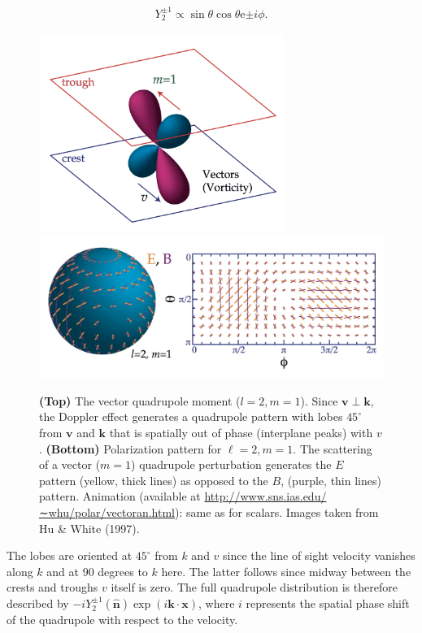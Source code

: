 \documentclass[a4paper,11pt]{article}
\begin{document}
\begin{align*}
    Y_2^{\pm1}\propto\sin\theta\cos\theta\mathrm{e}{\pm i\phi}.
\end{align*}

\begin{figure}[t!]
    \centering
    \includegraphics[width=8cm]{figures/VectorQuadrupole.png}
    \includegraphics[width=15cm]{figures/VectorPattern.png}
    \caption{\footnotesize{\textbf{(Top)} The vector quadrupole moment ($l=2,m=1$). Since $\bm{v}\perp\bm{k}$, the Doppler effect generates a quadrupole pattern with lobes $45^\circ$ from $\bm{v}$ and $\bm{k}$ that is spatially out of phase (interplane peaks) with $v$. \textbf{(Bottom)} Polarization pattern for $\ell=2,m=1$. The scattering of a vector ($m=1$) quadrupole perturbation generates the $E$ pattern (yellow, thick lines) as opposed to the $B$, (purple, thin lines) pattern. Animation (available at \href{http://www.sns.ias.edu/∼whu/polar/vectoran.html}{http://www.sns.ias.edu/∼whu/polar/vectoran.html}): same as for scalars. Images taken from Hu \& White (1997).}}
    \label{fig:vector}
\end{figure}

{\noindent}The lobes are oriented at $45^\circ$ from $k$ and $v$ since the line
of sight velocity vanishes along $k$ and at $90$ degrees to $k$ here. The latter follows since midway between the crests and troughs $v$ itself is zero. The full quadrupole distribution is therefore described by $-iY_2^{\pm1}(\bm{\hat{n}})\exp(i\bm{k}\cdot\bm{x})$, where $i$ represents the spatial phase shift of the quadrupole with respect to the velocity.
\end{document}
